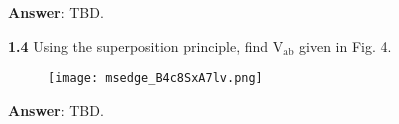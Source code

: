 \documentclass{article}
\begin{document}
\vspace{4mm}

{\textbf{Answer}: TBD.}

\vspace{8mm}

{\textbf{1.4} Using the superposition principle, find V$_{\text{ab}}$ given in Fig. 4.}

\begin{figure}[H]
    \centering
    \texttt{[image: msedge\_B4c8SxA7lv.png]}
\end{figure}

\vspace{4mm}

{\textbf{Answer}: TBD.}


\end{document}
